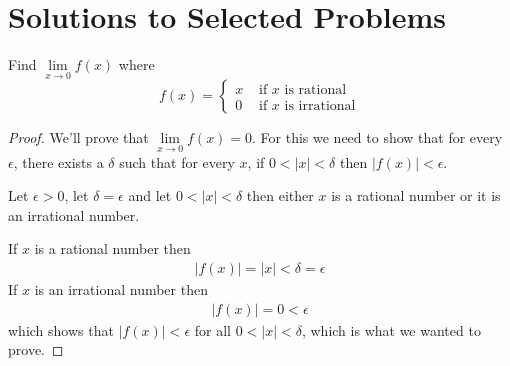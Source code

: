



\section*{Solutions to Selected Problems}

\begin{exercise*}
  Find
  $\lim \limits_{x \rightarrow 0} f(x)$ where $$f(x) = \begin{cases}
            x & \mbox{ if $x$ is rational}   \\
            0 & \mbox{ if $x$ is irrational}
          \end{cases}$$
\end{exercise*}
\begin{proof}
  We'll prove that $\lim \limits_{x \rightarrow 0} f(x) = 0$. For this we need to show that for every $\epsilon$, there exists a $\delta$ such that for every $x$, if $0 < |x| < \delta$ then $|f(x)| < \epsilon$.

  Let $\epsilon > 0$, let $\delta = \epsilon$ and let $0 < |x| < \delta$ then either $x$ is a rational number or it is an irrational number.

  If $x$ is a rational number then
  \begin{align*}
    |f(x)| = |x| < \delta = \epsilon
  \end{align*}
  If $x$ is an irrational number then
  \begin{align*}
    |f(x)| = 0 < \epsilon
  \end{align*}
  which shows that $|f(x)|< \epsilon$ for all $0 < |x| < \delta$, which is what we wanted to prove.
\end{proof}

